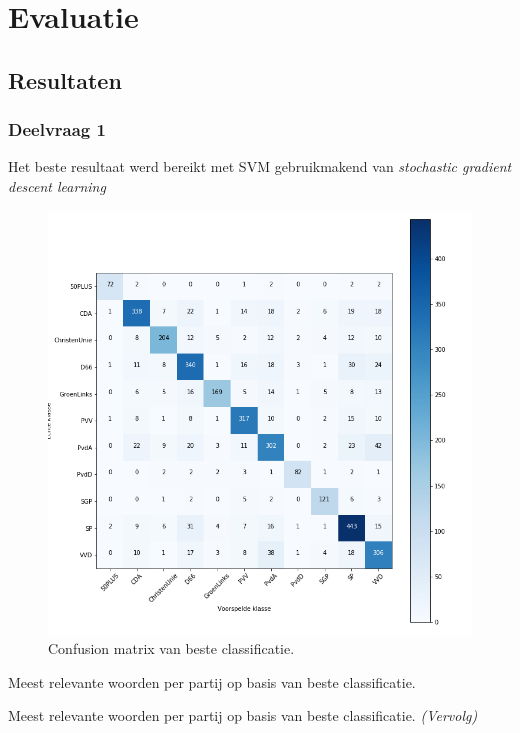\section{Evaluatie}
\label{sec:eva}

\subsection{Resultaten}

\subsubsection{Deelvraag 1}
Het beste resultaat werd bereikt met SVM gebruikmakend van \textit{stochastic gradient descent learning}

\begin{figure}[H]
  \caption{Confusion matrix van beste classificatie.}
  \centering
    \includegraphics[width=0.6\paperwidth]{Verslag/confusionmatrix.png}
\end{figure}

\begin{table}[H] 
\caption{Meest relevante woorden per partij op basis van beste classificatie.} 
\label{tab:MostImportantWordsWithoutNames} 
\centering 
 
\end{table} 
\addtocounter{table}{-1} 
\begin{table}[H] 
\caption{Meest relevante woorden per partij op basis van beste classificatie. \emph{(Vervolg)}} 
\centering 
 
\end{table}

